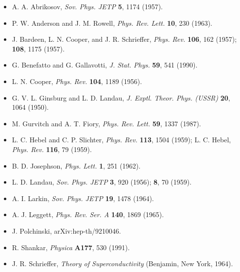 \begin{itemize}[leftmargin=2em,itemsep=0pt,parsep=0pt,label={}]
\item [A1957] A. A. Abrikosov, \emph{Sov. Phys. JETP} \textbf{5}, 1174 (1957).
\item [AR1963] P. W. Anderson and J. M. Rowell, \emph{Phys. Rev. Lett.} \textbf{10}, 230 (1963).
\item [BCS1957] J. Bardeen, L. N. Cooper, and J. R. Schrieffer, \emph{Phys. Rev.} \textbf{106}, 162 (1957); \textbf{108}, 1175 (1957).
\item [BG1990] G. Benefatto and G. Gallavotti, \emph{J. Stat. Phys.} \textbf{59}, 541 (1990).
\item [C1956] L. N. Cooper, \emph{Phys. Rev.} \textbf{104}, 1189 (1956).
\item [GL1950] G. V. L. Ginsburg and L. D. Landau, \emph{J. Exptl. Theor. Phys. (USSR)} \textbf{20}, 1064 (1950).
\item [GF1987] M. Gurvitch and A. T. Fiory, \emph{Phys. Rev. Lett.} \textbf{59}, 1337 (1987).
\item [HS1959] L. C. Hebel and C. P. Slichter, \emph{Phys. Rev.} \textbf{113}, 1504 (1959); L. C. Hebel, \emph{Phys. Rev.} \textbf{116}, 79 (1959).
\item [J1962] B. D. Josephson, \emph{Phys. Lett.} \textbf{1}, 251 (1962).
\item [L1956] L. D. Landau, \emph{Sov. Phys. JETP} \textbf{3}, 920 (1956); \textbf{8}, 70 (1959).
\item [L1964] A. I. Larkin, \emph{Sov. Phys. JETP} \textbf{19}, 1478 (1964).
\item [L1965] A. J. Leggett, \emph{Phys. Rev. Ser. A} \textbf{140}, 1869 (1965).
\item [P1992] J. Polchinski, arXiv:hep-th/9210046.
\item [SM1991] R. Shankar, \emph{Physica} \textbf{A177}, 530 (1991).
\item [S1964] J. R. Schrieffer, \emph{Theory of Superconductivity} (Benjamin, New York, 1964).
\end{itemize}
